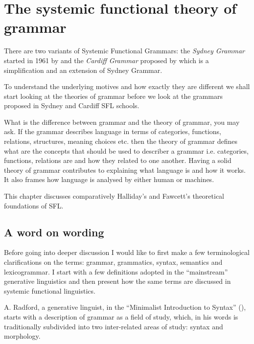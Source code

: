 \chapter{The systemic functional theory of grammar} %
\label{ch:sfg}
There are two variants of Systemic Functional Grammars: the \textit{Sydney Grammar} started in 1961 by \citet{Halliday2002} and the \textit{Cardiff Grammar} proposed by \citet{Fawcett2008} which is a simplification and an extension of Sydney Grammar.

To understand the underlying motives and how exactly they are different we shall start looking at the theories of grammar before we look at the grammars proposed in Sydney and Cardiff SFL schools. 

What is the difference between grammar and the theory of grammar, you may ask. If the grammar describes language in terms of categories, functions, relations, structures, meaning choices etc. then the theory of grammar defines what are the concepts that should be used to describer a grammar i.e. categories, functions, relations are and how they related to one another. Having a solid theory of grammar contributes to explaining what language is and how it works. It also frames how  language is analysed by either human or machines. 

This chapter discusses comparatively Halliday's \citep{Halliday2002} and Fawcett's \citep{Fawcett2000} theoretical foundations of SFL. 


\section{A word on wording}
Before going into deeper discussion I would like to first make a few terminological clarifications on the terms: grammar, grammatics, syntax, semantics and lexicogrammar. I start with a few definitions adopted in the ``mainstream'' generative linguistics and then present how the same terms are discussed in systemic functional linguistics.

A. Radford, a generative linguist, in the ``Minimalist Introduction to Syntax'' (\citeyear{Radford1997}), starts with a description of grammar as a field of study, which, in his words is traditionally subdivided into two inter-related areas of study: syntax and morphology. %

